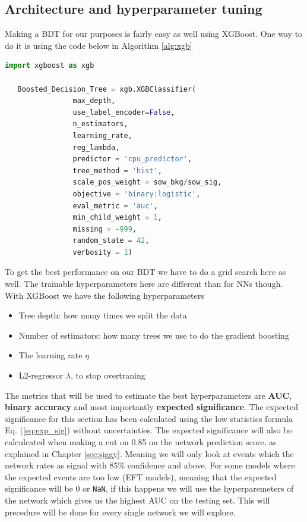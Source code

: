 \documentclass[14pt, a4paper]{book}
\begin{document}
\subsection{Architecture and hyperparameter tuning}\label{sec:BDTGriddy}
Making a BDT for our purposes is fairly easy as well using XGBoost. One way to do it is using the code below in Algorithm \ref{alg:xgb}
\begin{lstlisting}[language=Python, caption={Boosted Decision Tree definition using XGBoost}, label=alg:xgb, captionpos=t]
   import xgboost as xgb
   
   Boosted_Decision_Tree = xgb.XGBClassifier(
                max_depth, 
                use_label_encoder=False,
                n_estimators,
                learning_rate,
                reg_lambda,
                predictor = 'cpu_predictor',
                tree_method = 'hist',
                scale_pos_weight = sow_bkg/sow_sig,
                objective = 'binary:logistic',
                eval_metric = 'auc',
                min_child_weight = 1,
                missing = -999,
                random_state = 42,
                verbosity = 1) 
\end{lstlisting}
To get the best performance on our BDT we have to do a grid search here as well. The trainable hyperparameters here are different than for NNs though. With XGBoost we have the following hyperparameters
\begin{itemize}
   \item Tree depth: how many times we split the data
   \item Number of estimators: how many trees we use to do the gradient boosting
   \item The learning rate $\eta$
   \item L2-regressor $\lambda$, to stop overtraning
\end{itemize}
The metrics that will be used to estimate the best hyperparameters are \textbf{AUC}, \textbf{binary accuracy} and most importantly \textbf{expected significance}. 
The expected significance for this section has been calculated using the low statistics formula Eq. (\ref{eq:exp_sig}) without uncertainties. The expected significance will also be calculcated when making a cut on 0.85 on the network prediction score, as explained in Chapter \ref{sec:siggy}. 
Meaning we will only look at events which the network rates as signal with 85\% confidence and above. For some models where the expected events are too low (EFT models), meaning that the expected significance will be 0 or \verb|NaN|, if this happens we will use the hyperparemeters of the network 
which gives us the highest AUC on the testing set. This will precedure will be done for every single network we will explore.
\end{document}
